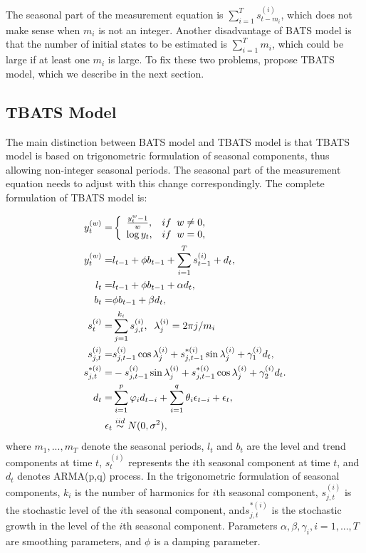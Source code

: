 \documentclass{uwstat572}
\begin{document}
The seasonal part of the measurement equation is $\sum\limits_{i=1}^T s_{t-m_i}^{(i)}$, which does not make sense when $m_i$ is not an integer. Another disadvantage of BATS model is that the number of initial states to be estimated is $\sum\limits_{i=1}^T m_i$, which could be large if at least one $m_i$ is large. To fix these two problems, \citet{de2011forecasting} propose TBATS model, which we describe in the next section.  

\subsection{TBATS Model}
\hspace{4ex}The main distinction between BATS model and TBATS model is that TBATS model is based on trigonometric formulation of seasonal components, thus allowing non-integer seasonal periods. The seasonal part of the measurement equation needs to adjust with this change correspondingly. The complete formulation of TBATS model is:

\begin{subequations}
\begin{align}
y_t^{  (w)} =& \left\{
\begin{array}{l l}
\frac{y_t^{w}-1}{w}, & if \;\; w \neq 0,\\
\log y_t, & if\;\; w=0,\\
\end{array} \right. \\
y_t^{  (w)}=&l_{t-1}+\phi b_{t-1} +\sum\limits_{i=1}^T s_{t-1}^{(i)}+d_t, \\
l_t=&l_{t-1}+\phi b_{t-1}+\alpha d_t, \\
 b_t=&\phi b_{t-1}+\beta d_t, \\
s_t^{(i)}=&\sum\limits_{j=1}^{k_i} s_{j,t}^{(i)},\;\;  \lambda_{j}^{(i)}=2\pi j /m_i \\
s_{j,t}^{(i)}=&s_{j,t-1}^{(i)} \cos \lambda_j^{(i)} + s_{j,t-1}^{*(i)} \sin \lambda_j^{(i)} +\gamma_1^{(i)}d_t, \\
s_{j,t}^{*(i)}=&-s_{j,t-1}^{(i)} \sin \lambda_j^{(i)} + s_{j,t-1}^{*(i)} \cos \lambda_j^{(i)} +\gamma_2^{(i)}d_t. \\
 d_t=&\sum\limits_{i=1}^p \varphi_id_{t-i} +\sum\limits_{i=1}^q \theta_i \epsilon_{t-i}+\epsilon_t, \\
 \epsilon_t & \stackrel{iid}{\sim} N(0,\sigma^2),
\end{align}
\end{subequations}
\noindent where $m_1,..., m_T$ denote the seasonal periods, $l_t$ and $b_t$ are the level and trend components at time $t$, $s_t^{(i)}$ represents the $i$th seasonal component at time $t$, and $d_t$ denotes ARMA(p,q) process. In the trigonometric formulation of seasonal components, $k_i$ is the number of harmonics for $i$th seasonal component, $s_{j,t}^{(i)}$ is the stochastic level of the $i$th seasonal component, and$s_{j,t}^{*(i)}$ is the stochastic growth in the level of the $i$th seasonal component. Parameters $\alpha, \beta, \gamma_i, i=1,...,T$ are smoothing parameters, and $\phi$ is a damping parameter. 
\end{document}
